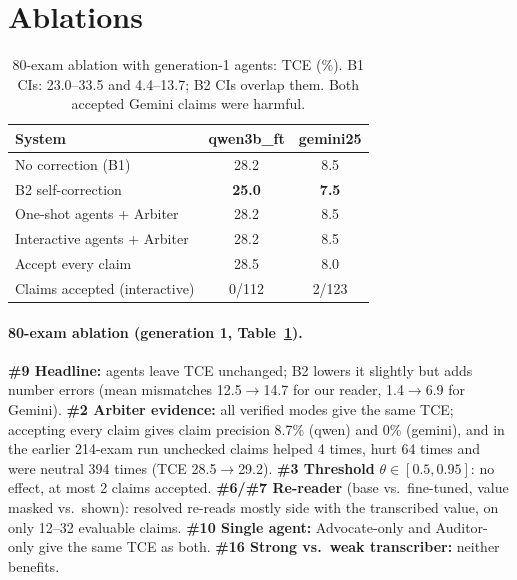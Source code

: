 \documentclass[11pt]{article}
\newcommand{\ra}{$\rightarrow$}
\begin{document}
\section{Ablations}

\begin{table}[t]
\centering\small
\begin{tabular}{@{}lcc@{}}
\toprule
System & qwen3b\_ft & gemini25 \\
\midrule
No correction (B1) & 28.2 & 8.5 \\
B2 self-correction & \textbf{25.0} & \textbf{7.5} \\
One-shot agents + Arbiter & 28.2 & 8.5 \\
Interactive agents + Arbiter & 28.2 & 8.5 \\
Accept every claim & 28.5 & 8.0 \\
Claims accepted (interactive) & 0/112 & 2/123 \\
\bottomrule
\end{tabular}
\caption{80-exam ablation with generation-1 agents: TCE (\%). B1 CIs: 23.0--33.5 and 4.4--13.7; B2 CIs overlap them. Both accepted Gemini claims were harmful.}
\label{tab:ablation}
\end{table}

\paragraph{80-exam ablation (generation 1, Table~\ref{tab:ablation}).}
\textbf{\#9 Headline:} agents leave TCE unchanged; B2 lowers it slightly but adds number errors (mean mismatches 12.5\ra14.7 for our reader, 1.4\ra6.9 for Gemini). \textbf{\#2 Arbiter evidence:} all verified modes give the same TCE; accepting every claim gives claim precision 8.7\% (qwen) and 0\% (gemini), and in the earlier 214-exam run unchecked claims helped 4 times, hurt 64 times and were neutral 394 times (TCE 28.5\ra29.2). \textbf{\#3 Threshold} $\theta\in[0.5,0.95]$: no effect, at most 2 claims accepted. \textbf{\#6/\#7 Re-reader} (base vs.\ fine-tuned, value masked vs.\ shown): resolved re-reads mostly side with the transcribed value, on only 12--32 evaluable claims. \textbf{\#10 Single agent:} Advocate-only and Auditor-only give the same TCE as both. \textbf{\#16 Strong vs.\ weak transcriber:} neither benefits.
\end{document}
